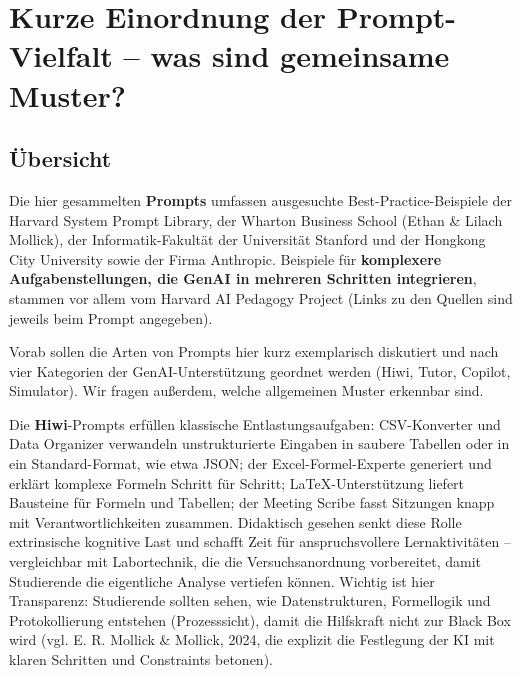 \documentclass[
  ngerman,
  letterpaper,
  DIV=11]{scrreprt}
\begin{document}
\section{Kurze Einordnung der Prompt-Vielfalt -- was sind gemeinsame
Muster?}\label{sec-prompts-ueberblick-intro}

\subsection{Übersicht}\label{uxfcbersicht-1}

Die hier gesammelten \textbf{Prompts} umfassen ausgesuchte
Best-Practice-Beispiele der Harvard System Prompt Library, der Wharton
Business School (Ethan \& Lilach Mollick), der Informatik-Fakultät der
Universität Stanford und der Hongkong City University sowie der Firma
Anthropic. Beispiele für \textbf{komplexere Aufgabenstellungen, die
GenAI in mehreren Schritten integrieren}, stammen vor allem vom Harvard
AI Pedagogy Project (Links zu den Quellen sind jeweils beim Prompt
angegeben).

Vorab sollen die Arten von Prompts hier kurz exemplarisch diskutiert und
nach vier Kategorien der GenAI-Unterstützung geordnet werden (Hiwi,
Tutor, Copilot, Simulator). Wir fragen außerdem, welche allgemeinen
Muster erkennbar sind.

Die \textbf{Hiwi}-Prompts erfüllen klassische Entlastungsaufgaben:
CSV-Konverter und Data Organizer verwandeln unstrukturierte Eingaben in
saubere Tabellen oder in ein Standard-Format, wie etwa JSON; der
Excel-Formel-Experte generiert und erklärt komplexe Formeln Schritt für
Schritt; LaTeX-Unterstützung liefert Bausteine für Formeln und Tabellen;
der Meeting Scribe fasst Sitzungen knapp mit Verantwortlichkeiten
zusammen. Didaktisch gesehen senkt diese Rolle extrinsische kognitive
Last und schafft Zeit für anspruchsvollere Lernaktivitäten --
vergleichbar mit Labortechnik, die die Versuchsanordnung vorbereitet,
damit Studierende die eigentliche Analyse vertiefen können. Wichtig ist
hier Transparenz: Studierende sollten sehen, wie Datenstrukturen,
Formellogik und Protokollierung entstehen (Prozesssicht), damit die
Hilfskraft nicht zur Black Box wird (vgl. E. R. Mollick \& Mollick,
2024, die explizit die Festlegung der KI mit klaren Schritten und
Constraints betonen).
\end{document}

